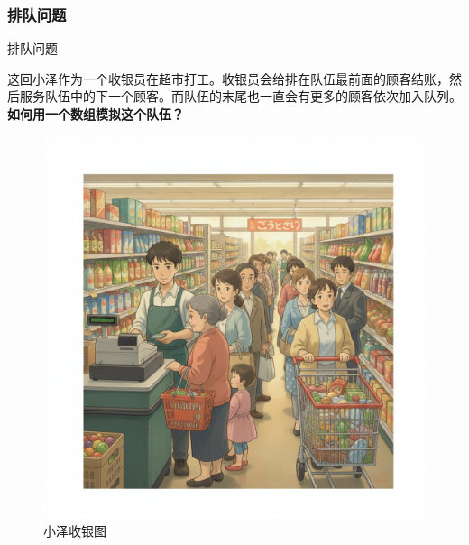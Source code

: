 \documentclass{beamer}
\begin{document}
\subsubsection{排队问题}
\begin{frame}{排队问题}
    \begin{minipage}[c]{0.5\linewidth}
        这回小泽作为一个收银员在超市打工。收银员会给排在队伍最前面的顾客结账，然后服务队伍中的下一个顾客。而队伍的末尾也一直会有更多的顾客依次加入队列。\\

        \textbf{如何用一个数组模拟这个队伍？}
    \end{minipage}
    \begin{minipage}{0.4\linewidth}
        \begin{figure}
            \begin{center}
                \includegraphics[width=\linewidth]{./pic/Gemini_Generated_Image_2sj2u2sj2u2sj2u2.png}
                \caption{小泽收银图}
            \end{center}
        \end{figure}
    \end{minipage}
\end{frame}
\end{document}
